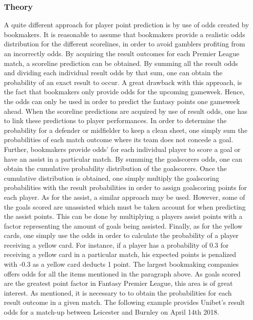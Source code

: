 \subsubsection{Theory}
A quite different approach for player point prediction is by use of odds created by bookmakers. It is reasonable to assume that bookmakers provide a realistic odds distribution for the different scorelines, in order to avoid gamblers profiting from an incorrectly odds. By acquiring the result outcomes for each Premier League match, a scoreline prediction can be obtained. By summing all the result odds and dividing each individual result odds by that sum, one can obtain the probability of an exact result to occur. A great drawback with this approach, is the fact that bookmakers only provide odds for the upcoming gameweek. Hence, the odds can only be used in order to predict the fantasy points one gameweek ahead. 
\newpar
When the scoreline predictions are acquired by use of result odds, one has to link these predictions to player performances. In order to determine the probability for a defender or midfielder to keep a clean sheet, one simply sum the probabilities of each match outcome where its team does not concede a goal. Further, bookmakers provide odds' for each individual player to score a goal or have an assist in a particular match. By summing the goalscorers odds, one can obtain the cumulative probability distribution of the goalscorers. Once the cumulative distribution is obtained, one simply multiply the goalscoring probabilities with the result probabilities in order to assign goalscoring points for each player. As for the assist, a similar approach may be used. However, some of the goals scored are unassisted which must be taken account for when predicting the assist points. This can be done by multiplying a players assist points with a factor representing the amount of goals being assisted. Finally, as for the yellow cards, one simply use the odds in order to calculate the probability of a player receiving a yellow card. For instance, if a player has a probability of 0.3 for receiving a yellow card in a particular match, his expected points is penalized with -0.3 as a yellow card deducts 1 point. 
\newpar
The largest bookmaking companies offers odds for all the items mentioned in the paragraph above. As goals scored are the greatest point factor in Fantasy Premier League, this area is of great interest. As mentioned, it is necessary to to obtain the probabilities for each result outcome in a given match. The following example provides Unibet's result odds for a match-up between Leicester and Burnley on April 14th 2018. 

